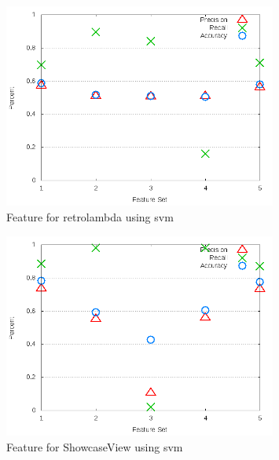 \begin{figure}[!t]
\centering
\includegraphics[width=0.8\textwidth]{images/svm/test_3/retrolambda_sample_range.png}
\caption{Feature for retrolambda using \gls{svm}}
\label{fig:test_3_retrolambda_svm}
\end{figure}

\begin{figure}[!t]
\centering
\includegraphics[width=0.8\textwidth]{images/svm/test_3/ShowcaseView_sample_range.png}
\caption{Feature for ShowcaseView using \gls{svm}}
\label{fig:test_3_ShowcaseView_svm}
\end{figure}

